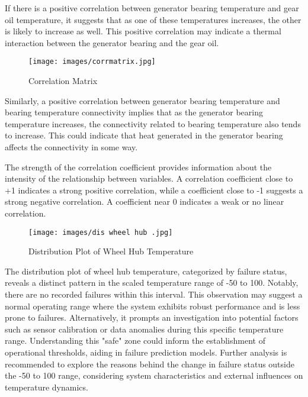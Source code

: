 \documentclass[11pt,a4paper]{article}
\begin{document}
If there is a positive correlation between generator bearing temperature and gear oil temperature, it suggests that as one of these temperatures increases, the other is likely to increase as well. This positive correlation may indicate a thermal interaction between the generator bearing and the gear oil.

\begin{figure}[h]
    \centering
    \texttt{[image: images/corrmatrix.jpg]}
    \caption{Correlation Matrix}
    \label{fig:corrmatrix}
\end{figure}

Similarly, a positive correlation between generator bearing temperature and bearing temperature connectivity implies that as the generator bearing temperature increases, the connectivity related to bearing temperature also tends to increase. This could indicate that heat generated in the generator bearing affects the connectivity in some way.

The strength of the correlation coefficient provides information about the intensity of the relationship between variables. A correlation coefficient close to +1 indicates a strong positive correlation, while a coefficient close to -1 suggests a strong negative correlation. A coefficient near 0 indicates a weak or no linear correlation.

\begin{figure}[]
    \centering
    \texttt{[image: images/dis wheel hub .jpg]}
    \caption{Distribution Plot of Wheel Hub Temperature}
    \label{fig:enter-label}
\end{figure}

The distribution plot of wheel hub temperature, categorized by failure status, reveals a distinct pattern in the scaled temperature range of -50 to 100. Notably, there are no recorded failures within this interval. This observation may suggest a normal operating range where the system exhibits robust performance and is less prone to failures. Alternatively, it prompts an investigation into potential factors such as sensor calibration or data anomalies during this specific temperature range. Understanding this "safe" zone could inform the establishment of operational thresholds, aiding in failure prediction models. Further analysis is recommended to explore the reasons behind the change in failure status outside the -50 to 100 range, considering system characteristics and external influences on temperature dynamics.
\end{document}

